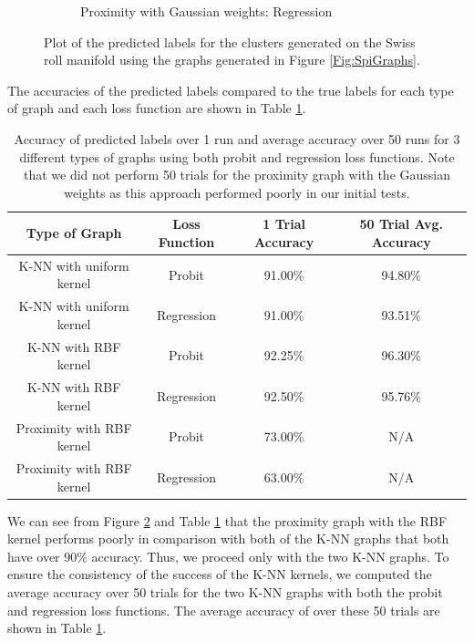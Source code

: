 \documentclass[12pt]{amsart}
\begin{document}
\begin{figure}[ht]
\begin{subfigure}{0.475\linewidth}
    \caption{Proximity with Gaussian weights: Regression} 
    \label{Fig:SpiProxReg} 
  \end{subfigure}
  \caption{Plot of the predicted labels for the clusters generated on the Swiss roll manifold using the graphs generated in Figure \ref{Fig:SpiGraphs}. }
  \label{Fig:SpiPred} 
\end{figure}
The accuracies of the predicted labels compared to the true labels for each type of graph and each loss function are shown in Table \ref{Table:SpiRes}.

\begin{table}
\begin{center}
\begin{tabular}{||c c c c||} 
 \hline
 Type of Graph & Loss Function & 1 Trial Accuracy & 50 Trial Avg. Accuracy\\ 
 \hline\hline
 K-NN with uniform kernel & Probit & 91.00\% & 94.80\%\\ 
 \hline
 K-NN with uniform kernel & Regression & 91.00\% & 93.51\%\\
 \hline
 K-NN with RBF kernel & Probit & 92.25\% & 96.30\%\\
 \hline
 K-NN with RBF kernel & Regression & 92.50\% & 95.76\%\\
 \hline
 Proximity with RBF kernel & Probit & 73.00\% & N/A\\
 \hline
 Proximity with RBF kernel & Regression & 63.00\% & N/A\\
 \hline
\end{tabular}
\caption{Accuracy of predicted labels over 1 run and average accuracy over 50 runs for 3 different types of graphs using both probit and regression loss functions. Note that we did not perform 50 trials for the proximity graph with the Gaussian weights as this approach performed poorly in our initial tests.}
\label{Table:SpiRes}
\end{center}
\end{table}
We can see from Figure \ref{Fig:SpiPred} and Table \ref{Table:SpiRes} that the proximity graph with the RBF kernel performs poorly in comparison with both of the K-NN graphs that both have over $90\%$ accuracy. Thus, we proceed only with the two K-NN graphs. To ensure the consistency of the success of the K-NN kernels, we computed the average accuracy over 50 trials for the two K-NN graphs with both the probit and regression loss functions. The average accuracy of over these 50 trials are shown in Table \ref{Table:SpiRes}. 
\end{document}
